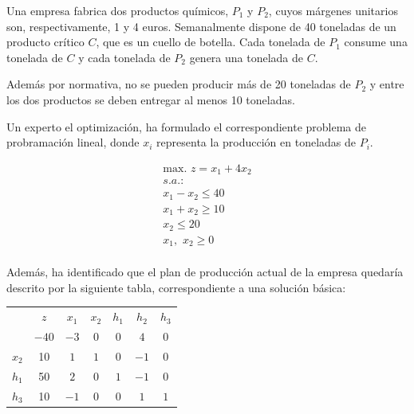 Una empresa fabrica dos productos químicos, $P_1$ y $P_2$, cuyos márgenes unitarios son, respectivamente, 1 y 4 euros. Semanalmente dispone de 40 toneladas de un producto crítico $C$, que es un cuello de botella. Cada tonelada de $P_1$ consume una tonelada de $C$ y cada tonelada de $P_2$ genera una tonelada de $C$.

Además por normativa, no se pueden producir más de 20 toneladas de $P_2$ y entre los dos productos se deben entregar al menos 10 toneladas.

Un experto el optimización, ha formulado el correspondiente problema de probramación lineal, donde $x_i$ representa la producción en toneladas de $P_i$. 


\begin{equation}
\begin{split}
\mbox{max. } z = x_1 + 4x_2\\
s.a.:\\
x_1 - x_2 \leq 40\\
x_1 + x_2 \geq 10\\
x_2 \leq 20\\
x_1,\,\,x_2\geq 0\\
\end{split}
\end{equation}

Además, ha identificado que el plan de producción actual de la empresa quedaría descrito por la siguiente tabla, correspondiente a una solución básica:

\begin{center}
\begin{tabular}{c|c|ccccc|}
 & $z$ & $x_1$ & $x_2$ & $h_1$ & $h_2$ & $h_3$\\ 
 & $-40$ & $-3$ & $0$ & $0$ & $4$ & $0$ \\ 
\hline
$x_2$ & 10  & $1$ & $1$ & $0$ & $-1$ & $0$\\ 
$h_1$ & 50  & $2$ & $0$ & $1$ & $-1$ & $0$\\ 
$h_3$ & 10  & $-1$ & $0$ & $0$ & $1$ & $1$\\ 
\hline
\end{tabular}
\end{center}




